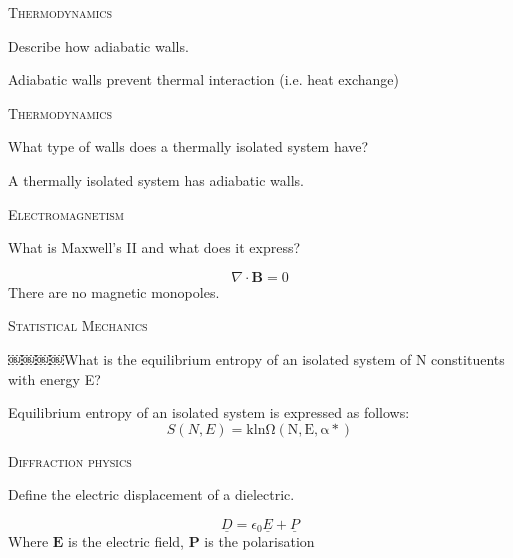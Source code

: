 \documentclass{article}
\newenvironment{flashcard}[2][]
  {\noindent\textsc{\Large#1}\par\vfill
   {\centering\Large#2\par}
   \vfill
   \newpage\Large\centering
  }
  {\newpage}
\begin{document}

\begin{flashcard}[Thermodynamics]{Describe how adiabatic walls.}

Adiabatic walls prevent thermal interaction (i.e. heat exchange)
\end{flashcard}


\begin{flashcard}[Thermodynamics]{What type of walls does a thermally isolated system have?}
A thermally isolated system has adiabatic walls.
\end{flashcard}


\begin{flashcard}[Electromagnetism]{What is Maxwell's II and what does it express?}
$$\nabla \cdot \mathbf{B} = 0$$
There are no magnetic monopoles.
\end{flashcard}


\begin{flashcard}[Statistical Mechanics]{￼￼￼￼What is the equilibrium entropy of an isolated system of N constituents with energy E?}
Equilibrium entropy of an isolated system is expressed as follows:
$$S(N, E) = \mathrm{k ln \Omega(N, E, {\alpha*})}$$

\end{flashcard}


\begin{flashcard}[Diffraction physics]{Define the electric displacement of a dielectric.}
$$\underline{D}=\epsilon_0 \underline{E}+\underline{P}$$
Where $ \mathbf{E}$ is the electric field, $\mathbf{P}$ is the polarisation

\end{flashcard}
\end{document}
